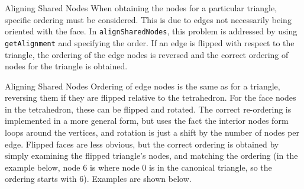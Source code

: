 \documentclass[12pt]{beamer}
\begin{document}
\begin{frame}{Aligning Shared Nodes}
When obtaining the nodes for a particular triangle, specific ordering must be considered. This is due to edges not necessarily being oriented with the face. In \texttt{alignSharedNodes}, this problem is addressed by using \texttt{getAlignment} and specifying the order. If an edge is flipped with respect to the triangle, the ordering of the edge nodes is reversed and the correct ordering of nodes for the triangle is obtained.

\end{frame}
\begin{frame}{Aligning Shared Nodes}
Ordering of edge nodes is the same as for a triangle, reversing them if they are flipped relative to the tetrahedron. For the face nodes in the tetrahedron, these can be flipped and rotated. The correct re-ordering is implemented in a more general form, but uses the fact the interior nodes form loops around the vertices, and rotation is just a shift by the number of nodes per edge. Flipped faces are less obvious, but the correct ordering is obtained by simply examining the flipped triangle's nodes, and matching the ordering (in the example below, node 6 is where node 0 is in the canonical triangle, so the ordering starts with 6). Examples are shown below.
\end{frame}
\end{document}
